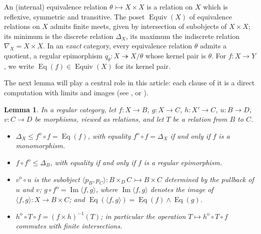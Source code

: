 \documentclass[11pt,a4paper]{article}
\theoremstyle{plain}
\newtheorem{lemme}[theoreme]{Lemma}
\theoremstyle{definition}
\theoremstyle{remark}
\theoremstyle{plain}
\newcommand{\Equiv}{\operatorname{Equiv}}
\newcommand{\Eq}{\operatorname{Eq}}
\newcommand{\im}{\operatorname{Im}}
\newcommand{\op}{\mathrm{o}}
\begin{document}
An (internal) equivalence relation
$\theta \rightarrowtail X \times X$ is a relation on $X$ which is reflexive, symmetric and transitive. The poset $\Equiv(X)$ of equivalence relations on
$X$ admits finite meets, given by intersection of subobjects of
$X \times X$; its minimum is the discrete relation $\Delta_X$, its maximum the indiscrete
relation $\nabla_X = X \times X$. In an \emph{exact} category, every
equivalence relation $\theta$ admits a quotient, a regular epimorphism
$q_\theta \colon X \twoheadrightarrow X/\theta$ whose kernel pair is
$\theta$. For $f \colon X \to Y$, we write $\Eq(f) \in \Equiv(X)$ for its
kernel pair.

The next lemma will play a central role in this article: each clause of it is a
direct computation with limits and images (see \cite[\S 2]{CKP}, or \cite{Gran}).

\begin{lemme}\label{lem:calcul}
In a regular category, let $f\colon X \to B$, $g\colon X \to C$,
$h\colon X' \to C$, $u\colon B \to D$, $v\colon C \to D$ be morphisms,
viewed as relations, and let $T$ be a relation from $B$ to $C$.
\begin{itemize}
\item[(1)] $\Delta_X \le f^{\op} \circ f = \Eq(f)$, with equality
$f^{\op} \circ f = \Delta_X$ if and only if $f$ is a monomorphism.
\item[(2)] $f \circ f^{\op} \le \Delta_B$, with equality if and only if $f$
is a regular epimorphism.
\item[(3)] $v^{\op} \circ u$ is the subobject
$\langle p_B, p_C\rangle \colon B \times_D C \rightarrowtail B \times C$
determined by the pullback of $u$ and $v$; $g \circ f^{\op} = \im \langle f,g\rangle$, where $\im \langle f,g\rangle$ denotes the image of $\langle f,g\rangle \colon X \rightarrow B \times C$; and
$\Eq(\langle f,g\rangle) = \Eq(f) \wedge \Eq(g)$.
\item[(4)] $h^{\op} \circ T \circ f = (f \times h)^{-1}(T)$; in particular
the operation $T \mapsto h^{\op} \circ T \circ f$ commutes with
finite intersections.
\end{itemize}
\end{lemme}
\end{document}
